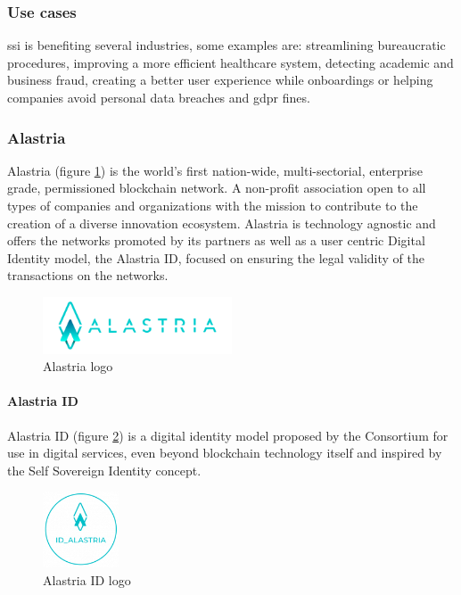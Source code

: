 \subsubsection{Use cases}
\acrlong{ssi} is benefiting several industries\cite{ssi-guide}, some examples are: streamlining bureaucratic procedures, improving a more efficient healthcare system, detecting academic and business fraud, creating a better user experience while onboardings or helping companies avoid personal data breaches and \acrshort{gdpr}\cite{gdpr} fines.

\subsubsection{Alastria}
Alastria (figure \ref{fig:alastria_logo}) is the world's first nation-wide, multi-sectorial, enterprise grade, permissioned blockchain network. A non-profit association open to all types of companies and organizations with the mission to contribute to the creation of a diverse innovation ecosystem. Alastria is technology agnostic and offers the networks promoted by its partners as well as a user centric Digital Identity model, the Alastria ID, focused on ensuring the legal validity of the transactions on the networks.
\begin{figure}[h]
    \centering
    \includegraphics[width=0.5\textwidth]{images/State of the Art/ssi/alastria-logo.png}
    \caption{Alastria logo}
    \label{fig:alastria_logo}
\end{figure}
\paragraph{Alastria ID}
Alastria ID (figure \ref{fig:alastria_id_logo}) is a digital identity model proposed by the Consortium for use in digital services, even beyond blockchain technology itself and inspired by the Self Sovereign Identity concept.\\
\begin{figure}[h]
    \centering
    \includegraphics[width=0.2\textwidth]{images/State of the Art/ssi/alastria-id-logo.png}
    \caption{Alastria ID logo}
    \label{fig:alastria_id_logo}
\end{figure}

